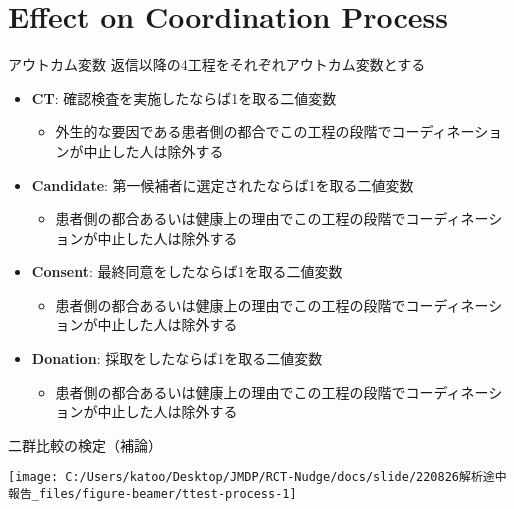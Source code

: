 \documentclass[
      aspectratio=169,
        12pt,
    ]{beamer}
\renewcommand{\textbf}[1]{{\color{DarkBlue}\bfseries#1}}
\providecommand{\tightlist}{%
  \setlength{\itemsep}{0pt}\setlength{\parskip}{0pt}}
\begin{document}
\hypertarget{effect-on-coordination-process}{%
\section{Effect on Coordination Process}\label{effect-on-coordination-process}}

\begin{frame}{アウトカム変数}
\protect\hypertarget{ux30a2ux30a6ux30c8ux30abux30e0ux5909ux6570-1}{}
返信以降の4工程をそれぞれアウトカム変数とする

\begin{itemize}
\tightlist
\item
  \textbf{CT}: 確認検査を実施したならば1を取る二値変数

  \begin{itemize}
  \tightlist
  \item
    外生的な要因である患者側の都合でこの工程の段階でコーディネーションが中止した人は除外する
  \end{itemize}
\item
  \textbf{Candidate}: 第一候補者に選定されたならば1を取る二値変数

  \begin{itemize}
  \tightlist
  \item
    患者側の都合あるいは健康上の理由でこの工程の段階でコーディネーションが中止した人は除外する
  \end{itemize}
\item
  \textbf{Consent}: 最終同意をしたならば1を取る二値変数

  \begin{itemize}
  \tightlist
  \item
    患者側の都合あるいは健康上の理由でこの工程の段階でコーディネーションが中止した人は除外する
  \end{itemize}
\item
  \textbf{Donation}: 採取をしたならば1を取る二値変数

  \begin{itemize}
  \tightlist
  \item
    患者側の都合あるいは健康上の理由でこの工程の段階でコーディネーションが中止した人は除外する
  \end{itemize}
\end{itemize}
\end{frame}

\begin{frame}{二群比較の検定（補論）}
\protect\hypertarget{ux4e8cux7fa4ux6bd4ux8f03ux306eux691cux5b9aux88dcux8ad6-1}{}
\begin{center}\texttt{[image: C:/Users/katoo/Desktop/JMDP/RCT-Nudge/docs/slide/220826解析途中報告\_files/figure-beamer/ttest-process-1]} \end{center}
\end{frame}
\end{document}
